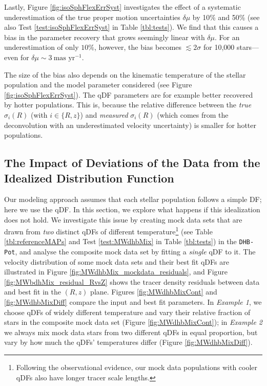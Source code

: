 \documentclass[iop,revtex4,numberedappendix,appendixfloats]{emulateapj}
\begin{document}
Lastly, Figure \ref{fig:isoSphFlexErrSyst} investigates the effect of a systematic underestimation of the true proper motion uncertainties $\delta \mu$ by 10\% and 50\% (see also Test \ref{test:isoSphFlexErrSyst} in Table \ref{tbl:tests}). We find that this causes a bias in the parameter recovery that grows seemingly linear with $\delta \mu$. For an underestimation of only $10\%$, however, the bias becomes $\lesssim 2 \sigma$ for 10,000 stars---even for $\delta \mu \sim 3~\text{mas yr}^{-1}$.

The size of the bias also depends on the kinematic temperature of the stellar population and the model parameter considered (see Figure \ref{fig:isoSphFlexErrSyst}). The qDF parameters are for example better recovered by hotter populations. This is, because the relative difference between the \emph{true} $\sigma_i(R)$ (with $i \in \{R,z\}$) and \emph{measured} $\sigma_i(R)$ (which comes from the deconvolution with an underestimated velocity uncertainty) is smaller for hotter populations. 

\subsection{The Impact of Deviations of the Data from the Idealized Distribution Function} \label{sec:results_mixedDFs}

Our modeling approach assumes that each stellar population follows a simple DF; here we use the qDF. In this section, we explore what happens if this idealization does not hold. We investigate this issue by creating mock data sets that are drawn from \emph{two} distinct qDFs of different temperature\footnote{Following the observational evidence, our mock data populations with cooler qDFs also have longer tracer scale lengths.} (see Table \ref{tbl:referenceMAPs} and Test \ref{test:MWdhbMix} in Table \ref{tbl:tests}) in the \texttt{DHB-Pot}, and analyse the composite mock data set by fitting a \emph{single} qDF to it. The velocity distribution of some mock data sets and their best fit qDFs are illustrated in Figure \ref{fig:MWdhbMix_mockdata_residuals}, and Figure \ref{fig:MWbdhMix_residual_RvsZ} shows the tracer density residuals between data and best fit in the $(R,z)$ plane. Figures \ref{fig:MWdhbMixCont} and \ref{fig:MWdhbMixDiff} compare the input and best fit parameters. In \emph{Example 1}, we choose qDFs of widely different temperature and vary their relative fraction of stars in the composite mock data set (Figure \ref{fig:MWdhbMixCont}); in \emph{Example 2} we always mix mock data stars from two different qDFs in equal proportion, but vary by how much the qDFs' temperatures differ (Figure \ref{fig:MWdhbMixDiff}). 
\end{document}
